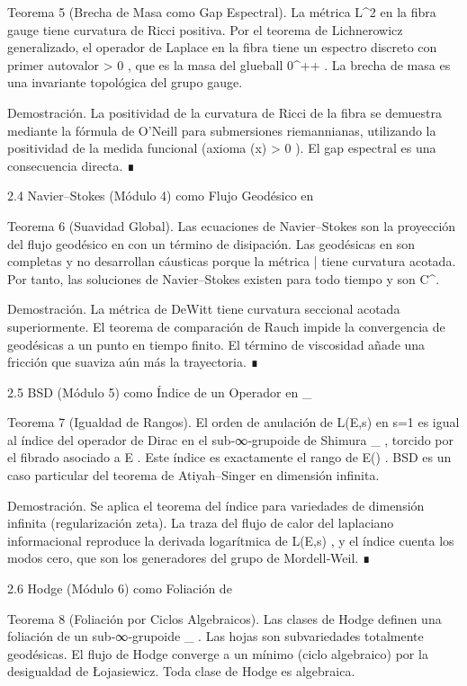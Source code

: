 \documentclass[12pt,a4paper]{book}
\begin{document}
Teorema 5 (Brecha de Masa como Gap Espectral). La métrica  L^2  en la fibra gauge tiene curvatura de Ricci positiva. Por el teorema de Lichnerowicz generalizado, el operador de Laplace en la fibra tiene un espectro discreto con primer autovalor  \Delta > 0 , que es la masa del glueball  0^{++} . La brecha de masa es una invariante topológica del grupo gauge.

Demostración. La positividad de la curvatura de Ricci de la fibra se demuestra mediante la fórmula de O’Neill para submersiones riemannianas, utilizando la positividad de la medida funcional (axioma  \rho(x) > 0 ). El gap espectral es una consecuencia directa. ∎

2.4 Navier–Stokes (Módulo 4) como Flujo Geodésico en   

Teorema 6 (Suavidad Global). Las ecuaciones de Navier–Stokes son la proyección del flujo geodésico en    con un término de disipación. Las geodésicas en    son completas y no desarrollan cáusticas porque la métrica  \bar{}  tiene curvatura acotada. Por tanto, las soluciones de Navier–Stokes existen para todo tiempo y son  C^\infty .

Demostración. La métrica de DeWitt tiene curvatura seccional acotada superiormente. El teorema de comparación de Rauch impide la convergencia de geodésicas a un punto en tiempo finito. El término de viscosidad añade una fricción que suaviza aún más la trayectoria. ∎

2.5 BSD (Módulo 5) como Índice de un Operador en  _{} 

Teorema 7 (Igualdad de Rangos). El orden de anulación de  L(E,s)  en  s=1  es igual al índice del operador de Dirac en el sub‑∞‑grupoide de Shimura  _{} , torcido por el fibrado asociado a  E . Este índice es exactamente el rango de  E() . BSD es un caso particular del teorema de Atiyah–Singer en dimensión infinita.

Demostración. Se aplica el teorema del índice para variedades de dimensión infinita (regularización zeta). La traza del flujo de calor del laplaciano informacional reproduce la derivada logarítmica de  L(E,s) , y el índice cuenta los modos cero, que son los generadores del grupo de Mordell‑Weil. ∎

2.6 Hodge (Módulo 6) como Foliación de   

Teorema 8 (Foliación por Ciclos Algebraicos). Las clases de Hodge definen una foliación de un sub‑∞‑grupoide  _{} . Las hojas son subvariedades totalmente geodésicas. El flujo de Hodge converge a un mínimo (ciclo algebraico) por la desigualdad de Łojasiewicz. Toda clase de Hodge es algebraica.
\end{document}
